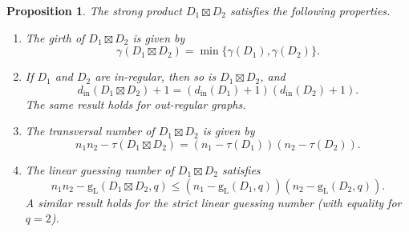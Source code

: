 \documentclass[a4paper, 11pt]{book}
\numberwithin{equation}{section}
\theoremstyle{plain}
\newtheorem{proposition}[equation]	{Proposition}
\newcommand{\degree}{d}
\newcommand{\inn}[1]{#1_\mathrm{in}}
\newcommand{\dIn}{\inn{\degree}}
\newcommand{\feedback}{\tau}
\newcommand{\girth}{\gamma}
\newcommand{\linear}[1]{#1_\mathrm{L}}
\newcommand{\guessing}{\mathrm{g}}
\newcommand{\linearGuessing}{\linear{\guessing}}
\renewcommand{\(}{\ldbrack}
\renewcommand{\)}{\rdbrack}
\begin{document}
\begin{proposition} \label{prop:strong_product}
The strong product $D_1 \boxtimes D_2$ satisfies the following properties.
\begin{enumerate}
	\item \label{it:strong_product_girth} The girth of $D_1 \boxtimes D_2$ is given by
	\[
		\girth(D_1 \boxtimes D_2) = \min\{ \girth(D_1), \girth(D_2) \}.
	\]
		
	\item If $D_1$ and $D_2$ are in-regular, then so is $D_1 \boxtimes D_2$, and
	\[
		\dIn(D_1 \boxtimes D_2) + 1 = (\dIn(D_1) + 1) (\dIn(D_2) + 1).
	\]
	The same result holds for out-regular graphs.
	
	\item The transversal number of $D_1 \boxtimes D_2$ is given by
	\[
		n_1n_2 - \feedback(D_1 \boxtimes D_2) = (n_1 - \feedback(D_1)) (n_2 - \feedback(D_2)).
	\]
	
	\item The linear guessing number of $D_1 \boxtimes D_2$ satisfies
	\[
		n_1n_2 - \linearGuessing(D_1 \boxtimes D_2, q) \le (n_1 - \linearGuessing(D_1, q)) (n_2 - \linearGuessing(D_2, q)).
	\]
	A similar result holds for the strict linear guessing number (with equality for $q=2$).
\end{enumerate}
\end{proposition}

%
%
%
%
\end{document}
